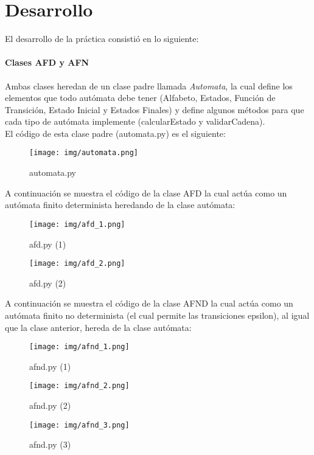 \section{Desarrollo}
	El desarrollo de la práctica consistió en lo siguiente:
	\paragraph{Clases AFD y AFN}
	Ambas clases heredan de un clase padre llamada \textit{Automata}, la cual define los elementos que todo autómata debe tener (Alfabeto, Estados, Función de Transición, Estado Inicial y Estados Finales) y define algunos métodos para que cada tipo de autómata implemente (calcularEstado y validarCadena).\\
	El código de esta clase padre (automata.py) es el siguiente:
	\begin{figure}[H]
		\begin{center}
			\texttt{[image: img/automata.png]}
			\caption{automata.py}
			\label{fig:tablas}
		\end{center}
	\end{figure}	
	A continuación se muestra el código de la clase AFD la cual actúa como un autómata finito determinista heredando de la clase autómata:\\
	\begin{figure}[H]
		\begin{center}
			\texttt{[image: img/afd\_1.png]}
			\caption{afd.py (1)}
			\label{fig:tablas}
		\end{center}
	\end{figure}
	\begin{figure}[H]
		\begin{center}
			\texttt{[image: img/afd\_2.png]}
			\caption{afd.py (2)}
			\label{fig:tablas}
		\end{center}
	\end{figure}
	A continuación se muestra el código de la clase AFND la cual actúa como un autómata finito no determinista (el cual permite las transiciones epsilon), al igual que la clase anterior, hereda de la clase autómata:\\
	\begin{figure}[H]
	\begin{center}
		\texttt{[image: img/afnd\_1.png]}
		\caption{afnd.py (1)}
		\label{fig:tablas}
	\end{center}
	\end{figure}
	\begin{figure}[H]
		\begin{center}
			\texttt{[image: img/afnd\_2.png]}
			\caption{afnd.py (2)}
			\label{fig:tablas}
		\end{center}
	\end{figure}
	\begin{figure}[H]
		\begin{center}
			\texttt{[image: img/afnd\_3.png]}
			\caption{afnd.py (3)}
			\label{fig:tablas}
		\end{center}
	\end{figure}
	\newpage
